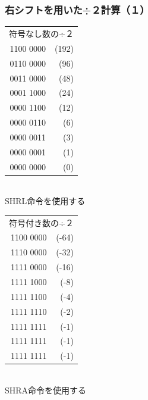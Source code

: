 \documentclass[handout]{beamer}        %
\begin{document}
\begin{frame}
  \frametitle{右シフトを用いた÷２計算（１）}
  \begin{minipage}{0.48\columnwidth}
    \begin{center}
      {\ttfamily%
        \begin{tabular}{r r}
          \multicolumn{2}{c}{符号なし数の÷２} \\
          1100 0000 & (192) \\ %
          0110 0000 & (96)  \\ %
          0011 0000 & (48)  \\ %
          0001 1000 & (24)  \\ %
          0000 1100 & (12)  \\ %
          0000 0110 & (6)   \\
          0000 0011 & (3)   \\
          0000 0001 & (1)   \\
          0000 0000 & (0)   \\
        \end{tabular}
      }\\
      \vspace{0.5cm}
      SHRL命令を使用する
    \end{center}
  \end{minipage}
  \begin{minipage}{0.48\columnwidth}
    \begin{center}
      {\ttfamily%
        \begin{tabular}{r r}
          \multicolumn{2}{c}{符号付き数の÷２} \\
          1100 0000 & (-64) \\
          1110 0000 & (-32) \\
          1111 0000 & (-16) \\
          1111 1000 & (-8)  \\
          1111 1100 & (-4)  \\
          1111 1110 & (-2)  \\
          1111 1111 & (-1) \\
          1111 1111 & (-1) \\
          1111 1111 & (-1) \\
        \end{tabular}
      }\\
      \vspace{0.5cm}
      SHRA命令を使用する
    \end{center}
  \end{minipage}
  \vfill
\end{frame}
\end{document}
